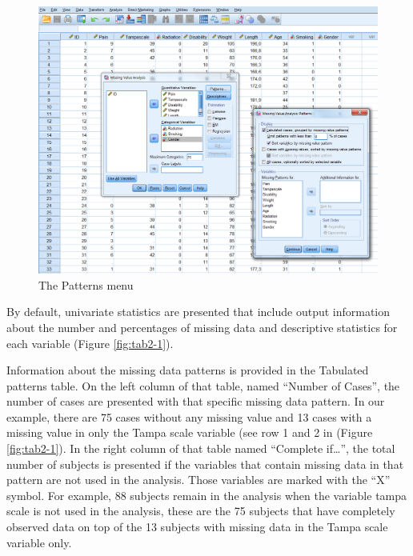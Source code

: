 \documentclass[
]{book}
\begin{document}
\begin{figure}

{\centering \includegraphics[width=0.9\linewidth]{images/fig2.4} 

}

\caption{The Patterns menu}\label{fig:fig2-4}
\end{figure}

By default, univariate statistics are presented that include output information about the number and percentages of missing data and descriptive statistics for each variable (Figure \ref{fig:tab2-1}).

Information about the missing data patterns is provided in the Tabulated patterns table. On the left column of that table, named ``Number of Cases'', the number of cases are presented with that specific missing data pattern. In our example, there are 75 cases without any missing value and 13 cases with a missing value in only the Tampa scale variable (see row 1 and 2 in (Figure \ref{fig:tab2-1}). In the right column of that table named ``Complete if\ldots{}'', the total number of subjects is presented if the variables that contain missing data in that pattern are not used in the analysis. Those variables are marked with the ``X'' symbol. For example, 88 subjects remain in the analysis when the variable tampa scale is not used in the analysis, these are the 75 subjects that have completely observed data on top of the 13 subjects with missing data in the Tampa scale variable only.
\end{document}
